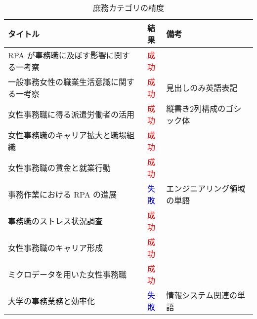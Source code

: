 \begin{table}[!htbp]
  \label{tab:doc_operation}
  \caption{庶務カテゴリの精度}
  \begin{center}
  \begin{tabular}{|l|c|l|}
    \hline
    \textbf{タイトル} & \textbf{結果} & \textbf{備考} \\ \hline
    RPA が事務職に及ぼす影響に関する一考察 & \textcolor{red}{成功} & \\ \hline
    一般事務女性の職業生活意識に関する一考察 & \textcolor{red}{成功} & 見出しのみ英語表記 \\ \hline
    女性事務職に得る派遣労働者の活用 & \textcolor{red}{成功} & 縦書き2列構成のゴシック体 \\ \hline
    女性事務職のキャリア拡大と職場組織 & \textcolor{red}{成功} & \\ \hline
    女性事務職の賃金と就業行動 & \textcolor{red}{成功} & \\ \hline
    事務作業における RPA の進展 & \textcolor{blue}{失敗} & エンジニアリング領域の単語 \\ \hline
    事務職のストレス状況調査 & \textcolor{red}{成功} & \\ \hline
    女性事務職のキャリア形成 & \textcolor{red}{成功} & \\ \hline
    ミクロデータを用いた女性事務職 & \textcolor{red}{成功} & \\ \hline
    大学の事務業務と効率化 & \textcolor{blue}{失敗} & 情報システム関連の単語 \\ \hline
  \end{tabular}
  \end{center}
\end{table}

